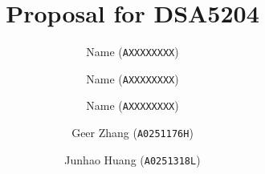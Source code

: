 \author{
  Name (\texttt{AXXXXXXXX})
  \and
  Name (\texttt{AXXXXXXXX})
  \and
  Name (\texttt{AXXXXXXXX})
  \and
  Geer Zhang (\texttt{A0251176H})
  \and
  Junhao Huang (\texttt{A0251318L})
}

\title{Proposal for DSA5204}  %
\date{}
